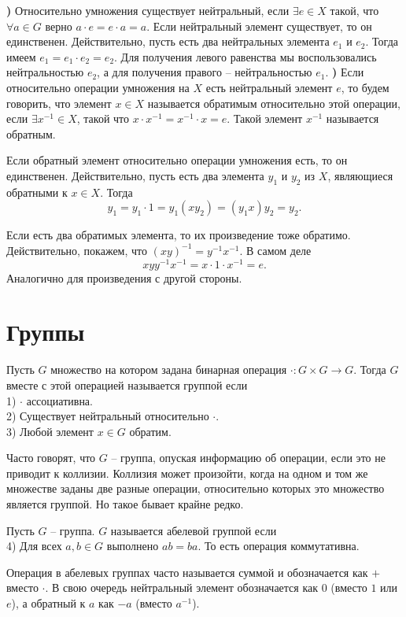 {\bf{})} Относительно умножения существует нейтральный, если $\exists e \in X$ такой, что $\forall a\in G$ верно $a\cdot e= e\cdot a= a$.
\rm Если нейтральный элемент существует, то он единственен. Действительно, пусть есть два нейтральных элемента $e_1$ и $e_2$. Тогда имеем $e_1=e_1\cdot e_2=e_2$. Для получения левого равенства мы воспользовались нейтральностью $e_2$, а для получения правого -- нейтральностью $e_1$.
\erm
{\bf{})} Если относительно операции умножения на $X$ есть нейтральный элемент $e$, то будем говорить, что элемент $x\in X$ называется обратимым относительно этой операции, если $\exists x^{-1} \in X$, такой что $x\cdot x^{-1}=x^{-1}\cdot x=e$. Такой элемент $x^{-1}$ называется обратным. 

\rm Если обратный элемент относительно операции умножения есть, то он единственен. Действительно, пусть   есть два элемента $y_1$ и $y_2$ из $X$, являющиеся обратными к $x\in X$. Тогда
$$y_1= y_1\cdot 1=y_1(xy_2)=(y_1x)y_2=y_2.$$
\erm

\rm Если есть два обратимых элемента, то их произведение тоже обратимо. Действительно, покажем, что $(xy)^{-1}= y^{-1}x^{-1}$. 
В самом деле 
$$xyy^{-1}x^{-1}= x\cdot 1\cdot x^{-1}=e.$$
Аналогично для произведения с другой стороны.
\erm



\section{Группы}

\dfn[Группа] Пусть $G$ множество на котором задана бинарная операция $\cdot \colon G \times G \to G$. Тогда $G$ вместе с этой операцией называется группой если \\
1) $\cdot$ ассоциативна.\\
2) Существует нейтральный относительно $\cdot$.\\
3) Любой элемент $x\in G$ обратим.
\edfn

Часто говорят, что $G$ -- группа, опуская информацию об операции, если это не приводит к коллизии. Коллизия может произойти, когда на одном и том же множестве заданы две разные операции, относительно которых это множество является группой. Но  такое бывает крайне редко.

 Пусть $G$ -- группа. $G$ называется абелевой группой если \\
4) Для всех $a,b \in G$ выполнено $ab=ba$. То есть операция коммутативна.
\edfn

Операция в абелевых группах часто называется суммой и обозначается как $+$ вместо $\cdot$. В свою очередь нейтральный элемент обозначается как $0$ (вместо $1$ или $e$), а обратный к $a$ как $-a$ (вместо $a^{-1}$).


